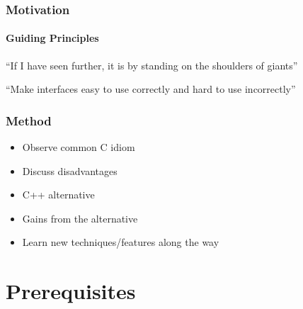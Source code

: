 \documentclass[table]{beamer}
\begin{document}
\begin{frame}
    \frametitle{Motivation}
    \framesubtitle{Guiding Principles}
    \begin{exampleblock}{}
        ``If I have seen further, it is by standing on the shoulders of giants''

        \hspace*{}
    \end{exampleblock}

    \begin{exampleblock}{}
        ``Make interfaces easy to use correctly and hard to use incorrectly''

        \hspace*{}
    \end{exampleblock}

\end{frame}

\begin{frame}
    \frametitle{Method}
    \begin{itemize}
        \item<1->Observe common C idiom
        \item<1->Discuss disadvantages
        \item<1->C++ alternative
        \item<1->Gains from the alternative
        \item<2->Learn new techniques/features along the way
    \end{itemize}
\end{frame}

\section{Prerequisites}
\frame{\sectionpage}
\end{document}
